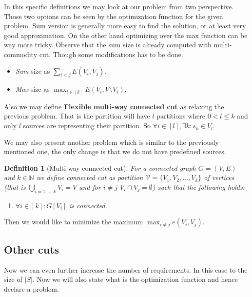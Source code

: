 \documentclass{article}
\theoremstyle{plain}
\theoremstyle{plain}
\newtheorem{defn}{Definition}
\theoremstyle{remark}
\begin{document}
	In this specific definitions we may look at our problem from two perspective. Those two options can be seen by the optimization function for the given problem. Sum version is generally more easy to find the solution, or at least very good approximation. On the other hand optimizing over the max function can be way more tricky. Observe that the sum size is already computed with multi-commodity cut. Though some modifications has to be done.
	
	\begin{itemize}
		\item \textit{Sum} size as $\sum_{i < j} E(V_i, V_j)$.
		\item \textit{Max} size as $\max_{i \in[k]} E(V_i, V \setminus V_i)$.
	\end{itemize}
	
	 Also we may define \textbf{Flexible multi-way connected cut} as relaxing the previous problem. That is the partition will have $l$ partitions where $0 < l \leq k$ and only $l$ sources are representing their partition. So $\forall i \in [l] , \exists k : s_k \in V_l$.
	 
	 We may also present another problem which is similar to the previously mentioned one, the only change is that we do not have predefined sources.
	 
	 \begin{defn}[Multi-way connected cut]
	 	For a connected graph $G = (V,E)$ and $k \in \mathbb{N}$ we define connected cut as partition $\mathcal{V} = \{V_1, V_2, \dots, V_k\}$ of vertices (that is $\bigcup_{i = 1, \dots, k} V_i = V$ and for $i \neq j$ $V_i \cap V_j = \emptyset$) such that the following holds:
	 	
	 	\begin{enumerate}
	 		\item $\forall i \in [k]: G[V_i]$ is connected.
	 	\end{enumerate}
	 \end{defn}
 
 	Then we would like to minimize the maximum $\max_{i \neq j} e(V_i, V_j)$.
	
	\subsection{Other cuts}
	
	Now we can even further increase the number of requirements. In this case to the size of $|S|$. Now we will also state what is the optimization function and hence declare a problem.
	
\end{document}
